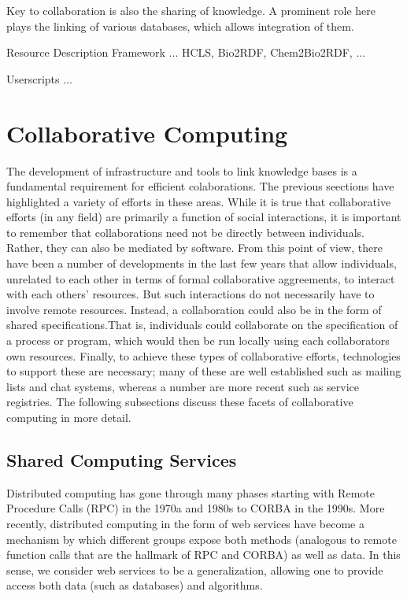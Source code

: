 \documentclass[12pt]{book}
\begin{document}
Key to collaboration is also the sharing of knowledge. A prominent role here
plays the linking of various databases, which allows integration of them.

Resource Description Framework ... HCLS, Bio2RDF, Chem2Bio2RDF, ...

Userscripts ...

\section{Collaborative Computing}

The development of infrastructure and tools to link knowledge bases is
a fundamental requirement for efficient colaborations. The previous
seections have highlighted a variety of efforts in these areas. While
it is true that collaborative efforts (in any field) are primarily a
function of social interactions, it is important to remember that
collaborations need not be directly between individuals. Rather, they
can also be mediated by software. From this point of view, there have
been a number of developments in the last few years that allow
individuals, unrelated to each other in terms of formal collaborative
aggreements, to interact with each others' resources. But such
interactions do not necessarily have to involve remote
resources. Instead, a collaboration could also be in the form of
shared specifications.That is, individuals could collaborate on the
specification of a process or program, which would then be run locally
using each collaborators own resources. Finally, to achieve these
types of collaborative efforts, technologies to support these are
necessary; many of these are well established such as mailing lists
and chat systems, whereas a number are more recent such as service
registries. The following subsections discuss these facets of
collaborative computing in more detail.

\subsection{Shared Computing Services}

Distributed computing has gone through many phases starting with
Remote Procedure Calls (RPC) in the 1970a and 1980s to CORBA in the
1990s. More recently, distributed computing in the form of web
services have become a mechanism by which different groups expose both
methods (analogous to remote function calls that are the hallmark of
RPC and CORBA) as well as data. In this sense, we consider web
services to be a generalization, allowing one to provide access both
data (such as databases) and algorithms.
\end{document}
